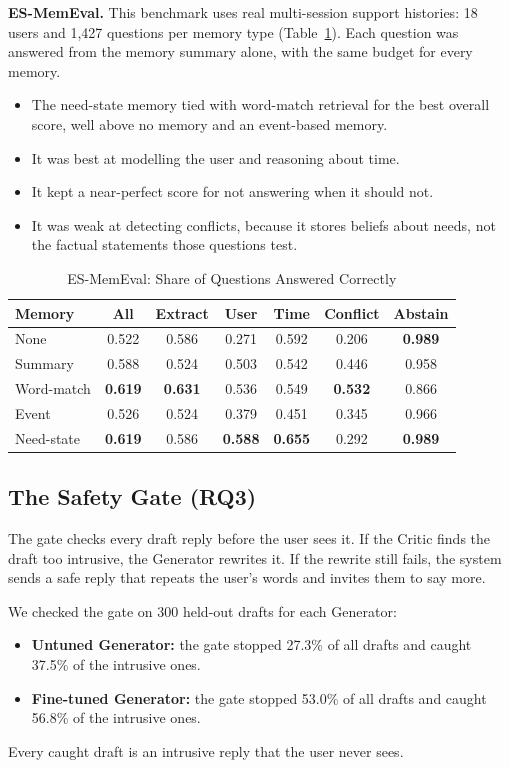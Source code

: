\documentclass[journal]{IEEEtran}
\newcommand{\tsize}{\footnotesize}
\begin{document}
\textbf{ES-MemEval.} This benchmark uses real multi-session support histories: 18 users and 1,427 questions per memory type (Table~\ref{tab:memeval}). Each question was answered from the memory summary alone, with the same budget for every memory.
\begin{itemize}
\item The need-state memory tied with word-match retrieval for the best overall score, well above no memory and an event-based memory.
\item It was best at modelling the user and reasoning about time.
\item It kept a near-perfect score for not answering when it should not.
\item It was weak at detecting conflicts, because it stores beliefs about needs, not the factual statements those questions test.
\end{itemize}

\begin{table}[!htb]
\caption{ES-MemEval: Share of Questions Answered Correctly}
\label{tab:memeval}
\centering\tsize
\setlength{\tabcolsep}{3pt}
\begin{tabular}{@{}lcccccc@{}}
\toprule
Memory & All & Extract & User & Time & Conflict & Abstain\\
\midrule
None & 0.522 & 0.586 & 0.271 & 0.592 & 0.206 & \textbf{0.989}\\
Summary & 0.588 & 0.524 & 0.503 & 0.542 & 0.446 & 0.958\\
Word-match & \textbf{0.619} & \textbf{0.631} & 0.536 & 0.549 & \textbf{0.532} & 0.866\\
Event & 0.526 & 0.524 & 0.379 & 0.451 & 0.345 & 0.966\\
Need-state & \textbf{0.619} & 0.586 & \textbf{0.588} & \textbf{0.655} & 0.292 & \textbf{0.989}\\
\bottomrule
\end{tabular}
\end{table}

\subsection{The Safety Gate (RQ3)}\label{sec:r-gate}
The gate checks every draft reply before the user sees it. If the Critic finds the draft too intrusive, the Generator rewrites it. If the rewrite still fails, the system sends a safe reply that repeats the user's words and invites them to say more.

We checked the gate on 300 held-out drafts for each Generator:
\begin{itemize}
\item \textbf{Untuned Generator:} the gate stopped 27.3\% of all drafts and caught 37.5\% of the intrusive ones.
\item \textbf{Fine-tuned Generator:} the gate stopped 53.0\% of all drafts and caught 56.8\% of the intrusive ones.
\end{itemize}
Every caught draft is an intrusive reply that the user never sees.
\end{document}
